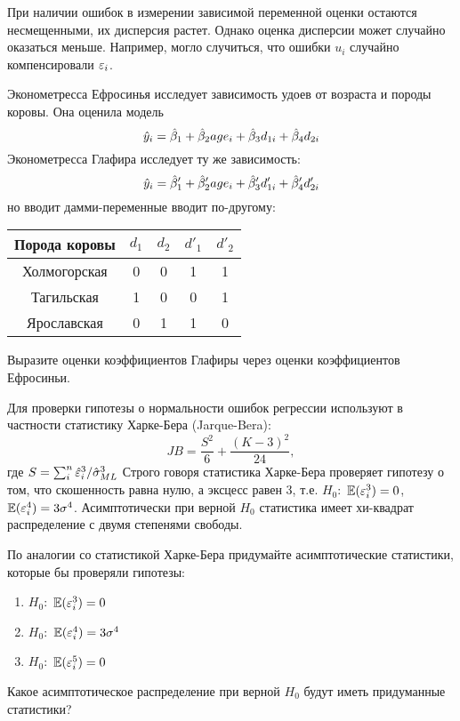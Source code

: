 \documentclass[pdftex,11pt,openany]{book}\usepackage[]{graphicx}\usepackage[]{color}
\begin{document}
\begin{solution}
При наличии ошибок в измерении зависимой переменной оценки остаются несмещенными, их дисперсия растет. Однако оценка дисперсии может случайно оказаться меньше. Например, могло случиться, что ошибки $u_i$ случайно компенсировали $\varepsilon_i$. 
\end{solution}

\begin{problem}
Эконометресса Ефросинья исследует зависимость удоев от возраста и породы коровы. Она оценила модель 
\[
\hat{y}_i = \hat{\beta}_1 + \hat{\beta}_2 age_i +\hat{\beta}_3 d_{1i} + \hat{\beta}_4 d_{2i} 
\]
Эконометресса Глафира исследует ту же зависимость:
\[
\hat{y}_i = \hat{\beta}'_1 + \hat{\beta}'_2 age_i +\hat{\beta}'_3 d'_{1i} + \hat{\beta}'_4 d'_{2i} 
\]
но вводит дамми-переменные вводит по-другому:

\begin{tabular}{c|cccc}
Порода коровы & $d_1$ & $d_2$ & $d'_1$ & $d'_2$  \\ 
\hline 
Холмогорская & 0 & 0 & 1 & 1 \\ 
Тагильская & 1 & 0 & 0 & 1  \\ 
Ярославская & 0 & 1 & 1 & 0  \\ 
\hline 
\end{tabular} 

Выразите оценки коэффициентов Глафиры через оценки коэффициентов Ефросиньи.
\end{problem}

\begin{solution}
\end{solution}

\begin{problem}
Для проверки гипотезы о нормальности ошибок регрессии используют в частности статистику Харке-Бера (Jarque-Bera):
\[
JB=\frac{S^2}{6} + \frac{(K-3)^2}{24},
\]
где $S=\sum_i^n \hat{\varepsilon}_i^3 /\hat{\sigma}^3_{ML}$ 
Строго говоря статистика Харке-Бера проверяет гипотезу о том, что скошенность равна нулю, а эксцесс равен 3, т.е. $H_0:$ $\mathbb{E}(\varepsilon_i^3)=0$, $\mathbb{E}(\varepsilon_i^4)=3\sigma^4$. Асимптотически при верной $H_0$ статистика имеет хи-квадрат распределение с двумя степенями свободы.

По аналогии со статистикой Харке-Бера придумайте асимптотические статистики, которые бы проверяли гипотезы:
\begin{enumerate}
\item $H_0:$ $\mathbb{E}(\varepsilon_i^3)=0$
\item $H_0:$ $\mathbb{E}(\varepsilon_i^4)=3\sigma^4$
\item $H_0:$ $\mathbb{E}(\varepsilon_i^5)=0$
\end{enumerate}
Какое асимптотическое распределение при верной $H_0$ будут иметь придуманные статистики?
\end{problem}
\end{document}
